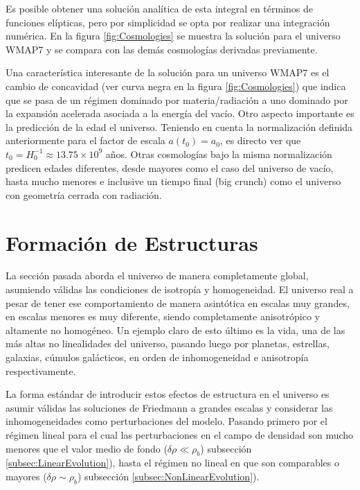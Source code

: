 Es posible obtener una solución analítica de esta integral en términos de 
funciones elípticas, pero por simplicidad se opta por realizar una 
integración numérica. En la figura \ref{fig:Cosmologies} se muestra la 
solución para el universo WMAP7 y se compara con las demás cosmologías 
derivadas previamente.


Una característica interesante de la solución para un universo WMAP7 es
el cambio de concavidad (ver curva negra en la figura \ref{fig:Cosmologies})
que indica que se pasa de un régimen dominado por materia/radiación a uno 
dominado por la expansión acelerada asociada a la energía del vacío. 
Otro aspecto importante es la predicción de la edad el universo. Teniendo 
en cuenta la normalización definida anteriormente para el factor de escala 
$a(t_0) = a_0$, es directo ver que $t_0 = H_0^{-1} \approx 13.75 \times 10^9$ 
años. Otras cosmologías bajo la misma normalización predicen edades
diferentes, desde mayores como el caso del universo de vacío, hasta mucho 
menores e inclusive un tiempo final (big crunch) como el universo con 
geometría cerrada con radiación.






\section{Formación de Estructuras}
\label{sec:StructureFormation}


La sección pasada aborda el universo de manera completamente global, 
asumiendo válidas las condiciones de isotropía y homogeneidad. El 
universo real a pesar de tener ese comportamiento de manera asintótica en
escalas muy grandes, en escalas menores es muy diferente, siendo 
completamente anisotrópico y altamente no homogéneo. Un ejemplo claro de 
esto último es la vida, una de las más altas no linealidades del universo,
pasando luego por planetas, estrellas, galaxias, cúmulos galácticos, en 
orden de inhomogeneidad e anisotropía respectivamente.


La forma estándar de introducir estos efectos de estructura en el universo
es asumir válidas las soluciones de Friedmann a grandes escalas y considerar
las inhomogeneidades como perturbaciones del modelo. Pasando primero por el
régimen lineal para el cual las perturbaciones en el campo de densidad son 
mucho menores que el valor medio de fondo ($\delta \rho \ll \rho_b$)
subsección \ref{subsec:LinearEvolution}), hasta el régimen no lineal en que 
son comparables o mayores ($\delta \rho \sim \rho_b$) subsección 
\ref{subsec:NonLinearEvolution}).


